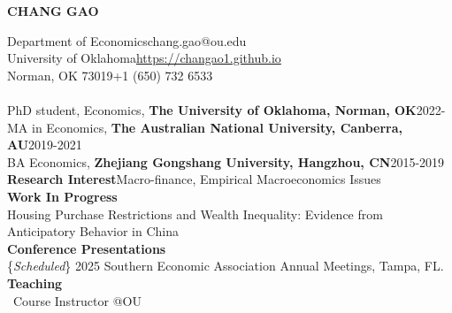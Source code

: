 \documentclass[12pt,letterpaper]{article}
\begin{document}
	\begin{center}
		{\bf\LARGE CHANG GAO}
	\end{center}
	\noindent Department of Economics\hfill chang.gao@ou.edu\medskip\\
	University of Oklahoma\hfill\href{https://changao1.github.io}{https://changao1.github.io}\medskip\\
Norman, OK   73019\hfill+1 (650) 732 6533\bigskip\\
	\medskip\\
	PhD student, Economics, {\bf The University of Oklahoma, Norman, OK}\hfill2022-\medskip\\
    MA in Economics, {\bf The Australian National University, Canberra, AU}\hfill2019-2021\medskip\\
	BA Economics, {\bf Zhejiang Gongshang University, Hangzhou, CN}\hfill2015-2019\bigskip\\
	{\bf Research Interest}\hfill Macro-finance, Empirical Macroeconomics Issues\bigskip\\
	{\bf Work In Progress}\medskip\\
Housing Purchase Restrictions and Wealth Inequality: Evidence from Anticipatory Behavior in China\medskip\\
{\bf Conference Presentations}\medskip\\
\{{\sl Scheduled}\} 2025 Southern Economic Association Annual Meetings, Tampa, FL. \bigskip\\
	{\bf Teaching}\medskip\\
	{\ Course Instructor @OU}
	
\end{document}

